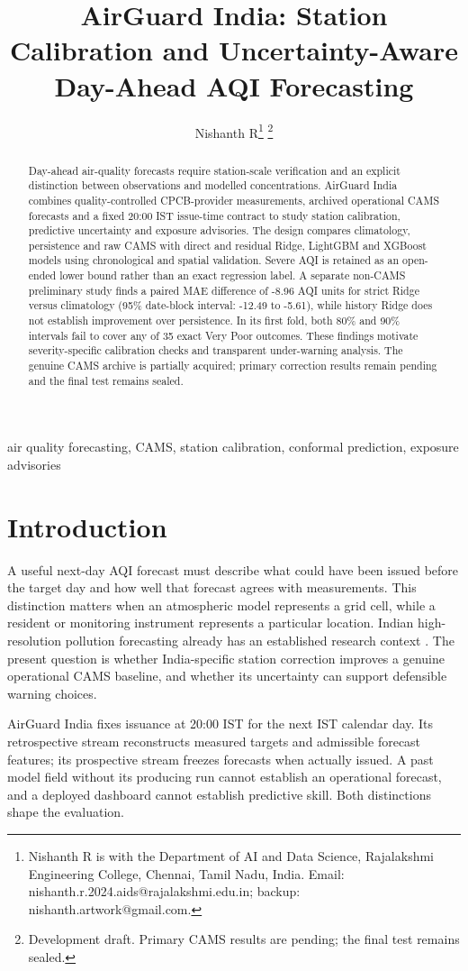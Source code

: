 \documentclass[journal]{IEEEtran}
\title{AirGuard India: Station Calibration and Uncertainty-Aware Day-Ahead AQI Forecasting}
\author{Nishanth R\thanks{Nishanth R is with the Department of AI and Data Science,
Rajalakshmi Engineering College, Chennai, Tamil Nadu, India.
Email: nishanth.r.2024.aids@rajalakshmi.edu.in; backup: nishanth.artwork@gmail.com.}
\thanks{Development draft. Primary CAMS results are pending; the final test remains sealed.}}
\begin{document}
\maketitle
\begin{abstract}
Day-ahead air-quality forecasts require station-scale verification and an
explicit distinction between observations and modelled concentrations.
AirGuard India combines quality-controlled CPCB-provider measurements,
archived operational CAMS forecasts and a fixed 20:00 IST issue-time contract
to study station calibration, predictive uncertainty and exposure advisories.
The design compares climatology, persistence and raw CAMS with direct and
residual Ridge, LightGBM and XGBoost models using chronological and spatial
validation. Severe AQI is retained as an open-ended lower bound rather than
an exact regression label. A separate non-CAMS preliminary study finds a
paired MAE difference of -8.96 AQI units for strict Ridge versus climatology
(95\% date-block interval: -12.49 to -5.61), while history Ridge does not
establish improvement over persistence. In its first fold, both 80\% and
90\% intervals fail to cover any of 35 exact Very Poor outcomes. These
findings motivate severity-specific calibration checks and transparent
under-warning analysis. The genuine CAMS archive is partially acquired;
primary correction results remain pending and the final test remains sealed.
\end{abstract}
\begin{IEEEkeywords}air quality forecasting, CAMS, station calibration, conformal prediction, exposure advisories\end{IEEEkeywords}
\section{Introduction}
A useful next-day AQI forecast must describe what could have been issued
before the target day and how well that forecast agrees with measurements.
This distinction matters when an atmospheric model represents a grid cell,
while a resident or monitoring instrument represents a particular location.
Indian high-resolution pollution forecasting already has an established
research context \cite{jena2021delhi}. The present question is whether
India-specific station correction improves a genuine operational CAMS
baseline, and whether its uncertainty can support defensible warning choices.

AirGuard India fixes issuance at 20:00 IST for the next IST calendar day.
Its retrospective stream reconstructs measured targets and admissible
forecast features; its prospective stream freezes forecasts when actually
issued. A past model field without its producing run cannot establish an
operational forecast, and a deployed dashboard cannot establish predictive
skill. Both distinctions shape the evaluation.
\end{document}
